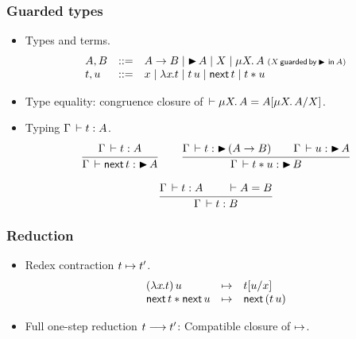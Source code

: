 \documentclass[t]{beamer}
\newcommand{\nex}{\tnext\,}
\newcommand{\muT}[2]{\mu {#1} \hspace{-0.1em} . \,  {#2}}
\begin{document}
\begin{frame}%
  \frametitle{Guarded types}
  \begin{itemize}
  \item Types and terms.
\[
\begin{array}{lrl}
  A,B & ::= &  A \to B \mid \later A \mid X \mid \muT X A \; {\scriptstyle (X \, \mathsf{guarded} \, \mathsf{by} \, \later \, \mathsf{in} \, A)}
\\
  t,u & ::= & x \mid \lam x t \mid t \, u \mid \nex t \mid t \ast u
\end{array}
\]
  \item Type equality: congruence closure of $\der \muT X A = \subst
    {\muT X A} X A$.
  \item Typing $\Gamma \,\vdash t : A$.
\begin{gather*}
   \ru{\Gamma \der t : A}{\Gamma \der \nex t : \later A}
\qquad
   \ru{\Gamma \der t : \later(A \to B) \qquad
       \Gamma \der u : \later A
     }{\Gamma \der t \ast u : \later B}
\\[2ex]
  \ru{\Gamma \der t : A \qquad \der A = B
    }{\Gamma \der t : B}
\end{gather*}
  \end{itemize}
\end{frame}

\begin{frame}%
  \frametitle{Reduction}
  \begin{itemize}
  \item Redex contraction $t \mapsto t'$.
\[
\begin{array}{lcl}
  (\lam x t)\, u & \contr & \subst u x t \\
  \nex t \ast \nex u & \contr & \nex (t\,u) \\
\end{array}
\]
  \item Full one-step reduction $t \longrightarrow t'$: Compatible closure of $\mapsto$.
  \end{itemize}
\end{frame}
\end{document}
